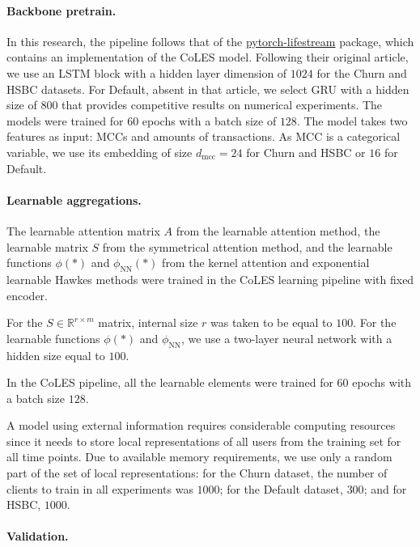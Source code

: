 \paragraph{Backbone pretrain.} In this research, the pipeline follows that of the \href{https://github.com/dllllb/pytorch-lifestream/tree/main}{pytorch-lifestream} package, which contains an implementation of the CoLES model. 
Following their original article, we use an LSTM block with a hidden layer dimension of $1024$ for the Churn and HSBC datasets.
For Default, absent in that article, we select GRU with a hidden size of $800$ that provides competitive results on numerical experiments.
The models were trained for $60$ epochs with a batch size of $128$.
The model takes two features as input: MCCs and amounts of transactions. 
As MCC is a categorical variable, we use its embedding of size $d_{\mathrm{mcc}} = 24$ for Churn and HSBC or $16$ for Default.


\paragraph{Learnable aggregations.}
The learnable attention matrix $A$ from the learnable attention method, the learnable matrix $S$ from the symmetrical attention method, and the learnable functions $\phi(*)$ and $\phi_{\mathrm{NN}}(*)$ from the kernel attention and exponential learnable Hawkes methods were trained in the CoLES learning pipeline with fixed encoder. 

For the  $S \in \mathbb{R}^{r \times m}$ matrix, internal size $r$ was taken to be equal to $100$. For the learnable functions $\phi(*)$ and  $\phi_{\mathrm{NN}}$, we use a two-layer neural network with a hidden size equal to $100$. 

In the CoLES pipeline, all the learnable elements were trained for $60$ epochs with a batch size $128$.

A model using external information requires considerable computing resources since it needs to store local representations of all users from the training set for all time points.
Due to available memory requirements, we use only a random part of the set of local representations: for the Churn dataset, the number of clients to train in all experiments was $1000$; for the Default dataset, $300$; and for HSBC, $1000$.


\paragraph{Validation.} 


